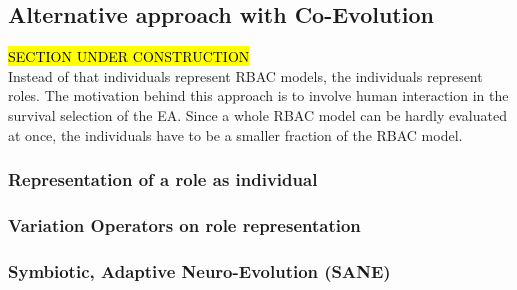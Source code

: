     \subsection{Alternative approach with Co-Evolution}
    \hl{SECTION UNDER CONSTRUCTION}\\
    Instead of that individuals represent RBAC models, the individuals represent roles. The motivation behind this approach is to involve human interaction in the survival selection of the EA. Since a whole RBAC model can be hardly evaluated at once, the individuals have to be a smaller fraction of the RBAC model.
        \subsubsection{Representation of a role as individual}
        \subsubsection{Variation Operators on role representation}
        \subsubsection{Symbiotic, Adaptive Neuro-Evolution (SANE)}

